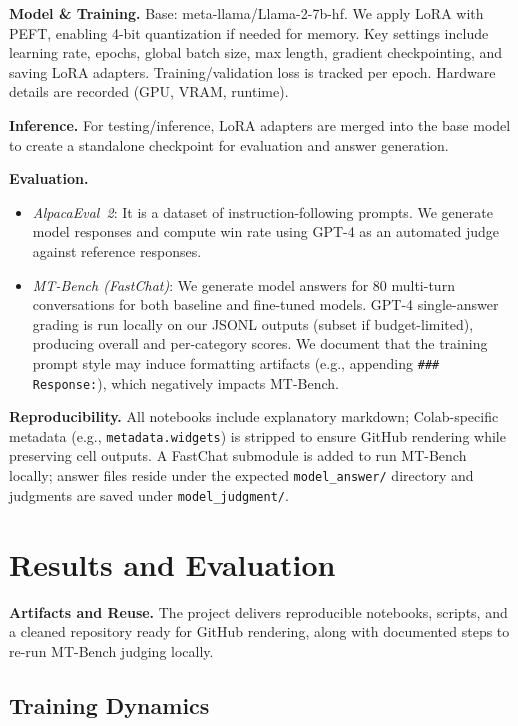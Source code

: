 \documentclass{assignment7_report}
\begin{document}
\textbf{Model \& Training.} Base: meta-llama/Llama-2-7b-hf. We apply LoRA with PEFT, enabling 4-bit quantization if needed for memory. Key settings include learning rate, epochs, global batch size, max length, gradient checkpointing, and saving LoRA adapters. Training/validation loss is tracked per epoch. Hardware details are recorded (GPU, VRAM, runtime).

\textbf{Inference.} For testing/inference, LoRA adapters are merged into the base model to create a standalone checkpoint for evaluation and answer generation.

\textbf{Evaluation.} 
\begin{itemize}
  \item \emph{AlpacaEval~2}: It is a dataset of instruction-following prompts. We generate model responses and compute win rate using GPT-4 as an automated judge against reference responses.
  \item \emph{MT-Bench (FastChat)}: We generate model answers for 80 multi-turn conversations for both baseline and fine-tuned models. GPT-4 single-answer grading is run locally on our JSONL outputs (subset if budget-limited), producing overall and per-category scores. We document that the training prompt style may induce formatting artifacts (e.g., appending \texttt{\#\#\# Response:}), which negatively impacts MT-Bench.
\end{itemize}

\textbf{Reproducibility.} All notebooks include explanatory markdown; Colab-specific metadata (e.g., \texttt{metadata.widgets}) is stripped to ensure GitHub rendering while preserving cell outputs. A FastChat submodule is added to run MT-Bench locally; answer files reside under the expected \texttt{model\_answer/} directory and judgments are saved under \texttt{model\_judgment/}.


\section{Results and Evaluation}
\vspace*{-3mm}

\textbf{Artifacts and Reuse.} The project delivers reproducible notebooks, scripts, and a cleaned repository ready for GitHub rendering, along with documented steps to re-run MT-Bench judging locally.

\subsection{Training Dynamics}
\end{document}
